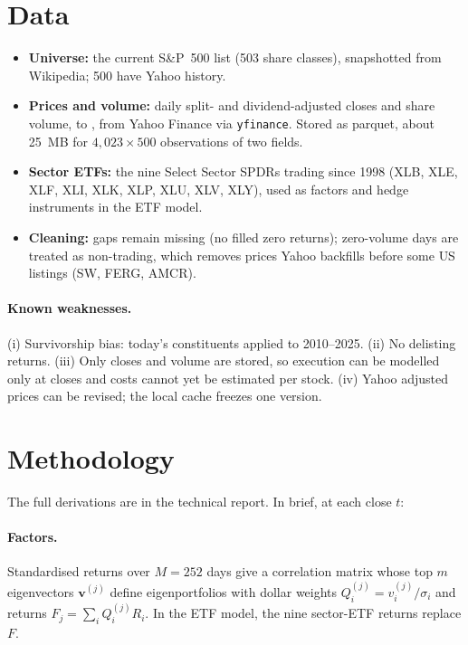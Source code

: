 \documentclass[11pt,a4paper]{article}
\newcommand{\code}[1]{\texttt{#1}}
\begin{document}
\section{Data}
\label{sec:data}

\begin{itemize}
  \item \textbf{Universe:} the current S\&P~500 list (503 share classes), snapshotted from
        Wikipedia; 500 have Yahoo history.
  \item \textbf{Prices and volume:} daily split- and dividend-adjusted closes and share volume,
        \DataStart{} to \DataEnd{}, from Yahoo Finance via \code{yfinance}. Stored as parquet,
        about 25~MB for $4{,}023 \times 500$ observations of two fields.
  \item \textbf{Sector ETFs:} the nine Select Sector SPDRs trading since 1998 (XLB, XLE, XLF,
        XLI, XLK, XLP, XLU, XLV, XLY), used as factors and hedge instruments in the ETF model.
  \item \textbf{Cleaning:} gaps remain missing (no filled zero returns); zero-volume days are
        treated as non-trading, which removes prices Yahoo backfills before some US listings
        (SW, FERG, AMCR).
\end{itemize}

\paragraph{Known weaknesses.} (i) Survivorship bias: today's constituents applied to 2010--2025.
(ii) No delisting returns. (iii) Only closes and volume are stored, so execution can be
modelled only at closes and costs cannot yet be estimated per stock. (iv) Yahoo adjusted prices
can be revised; the local cache freezes one version.

\section{Methodology}
\label{sec:method}

The full derivations are in the technical report. In brief, at each close $t$:

\paragraph{Factors.} Standardised returns over $M=252$ days give a correlation matrix whose top
$m$ eigenvectors $\bm v^{(j)}$ define eigenportfolios with dollar weights
$Q_i^{(j)} = v_i^{(j)}/\sigma_i$ and returns $F_j = \sum_i Q_i^{(j)} R_i$. In the ETF model, the
nine sector-ETF returns replace $F$.
\end{document}

